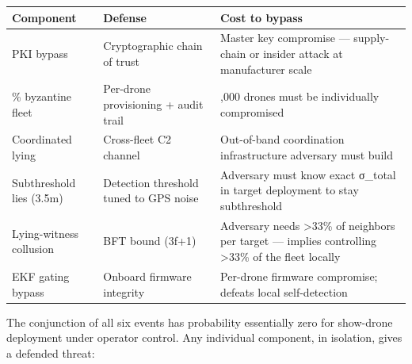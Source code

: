 {\def\LTcaptype{none} %
\begin{longtable}[]{@{}
  >{\raggedright\arraybackslash}p{}
  >{\raggedright\arraybackslash}p{}
  >{\raggedright\arraybackslash}p{}@{}}
\toprule\noalign{}
\begin{minipage}[b]{\linewidth}\raggedright
Component
\end{minipage} & \begin{minipage}[b]{\linewidth}\raggedright
Defense
\end{minipage} & \begin{minipage}[b]{\linewidth}\raggedright
Cost to bypass
\end{minipage} \\
\midrule\noalign{}
\endhead
\bottomrule\noalign{}
\endlastfoot
PKI bypass & Cryptographic chain of trust & Master key compromise ---
supply-chain or insider attack at manufacturer scale \\
10\% byzantine fleet & Per-drone provisioning + audit trail & 1,000
drones must be individually compromised \\
Coordinated lying & Cross-fleet C2 channel & Out-of-band coordination
infrastructure adversary must build \\
Subthreshold lies (3.5m) & Detection threshold tuned to GPS noise &
Adversary must know exact σ\_total in target deployment to stay
subthreshold \\
Lying-witness collusion & BFT bound (3f+1) & Adversary needs
\textgreater33\% of neighbors per target --- implies controlling
\textgreater33\% of the fleet locally \\
EKF gating bypass & Onboard firmware integrity & Per-drone firmware
compromise; defeats local self-detection \\
\end{longtable}
}

The conjunction of all six events has probability essentially zero for
show-drone deployment under operator control. Any individual component,
in isolation, gives a defended threat:

